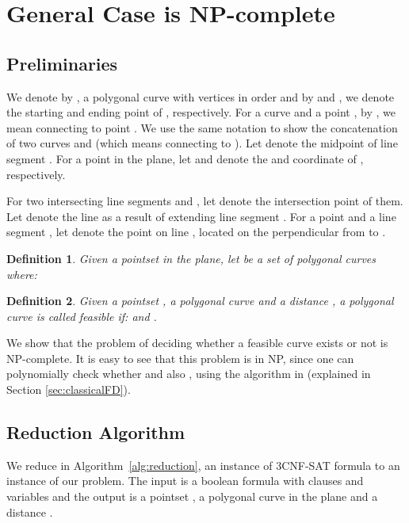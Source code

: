 \documentclass[12pt]{dalthesis}
\newtheorem{definition}{Definition}
\begin{document}
\section{General Case is NP-complete}
\label{sec:NPComp}

\subsection{Preliminaries}
We denote by , a polygonal curve 
with vertices  in order 
and by  and , we denote 
the starting and ending point of , respectively.
For a curve  and a point , by , 
we mean connecting  to point .
We use the same notation  
to show the concatenation of 
two curves  and  (which means connecting  to ).
Let  denote the  midpoint of line segment . 
For a point  in the plane, let  and 
denote the  and  coordinate of , respectively.


For two intersecting line segments  and , let  denote the intersection point of them.
Let  denote the line as a result of 
extending line segment .
For a point  and a line segment ,
let  denote the point on
line ,
located on the perpendicular from  to .


\begin{definition} \label{def:curves}
Given a pointset  in the plane, let 
be a set of polygonal curves  where: 

\end{definition}

\begin{definition} \label{def:feasibleNPC}
Given a pointset , a polygonal curve  and a distance , 
a polygonal curve  is called {\em feasible} if: 
 and .
\end{definition}

We show that the problem of deciding whether a 
feasible curve exists or not  is NP-complete.
It is easy to see that this problem is in NP, since 
one can polynomially check whether 
and also , using the algorithm in \cite{AltG95} 
(explained in Section \ref{sec:classicalFD}).





\subsection{Reduction Algorithm}

We reduce in Algorithm~\ref{alg:reduction},
an instance of 3CNF-SAT formula  
to an instance of our problem.
The input is a boolean formula 
 with  clauses  and  variables  
and the output is a pointset ,
a polygonal curve  in the plane and 
a distance .
\end{document}
